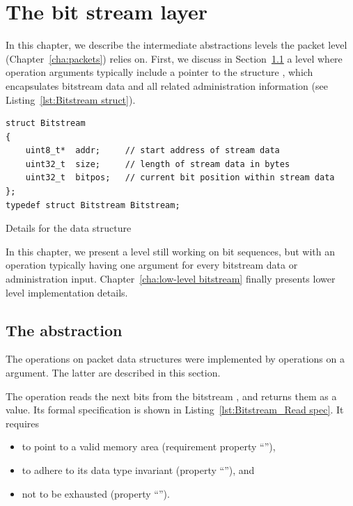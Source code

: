 
\FloatBarrier

\chapter{The bit stream layer}
\label{cha:bitstream}

In this chapter, we describe the intermediate abstractions levels the
packet level (Chapter~\ref{cha:packets}) relies on.
%
First, we discuss in Section~\ref{sec:bitstream}
a level where operation arguments typically include a pointer to the
\isoc structure , which
encapsulates bitstream data and all related administration information 
(see Listing~\ref{lst:Bitstream struct}).


\begin{listing}[hbt]
\begin{minipage}{0.99\textwidth}
\begin{lstlisting}[style=acsl-block]
struct Bitstream
{
    uint8_t*  addr;     // start address of stream data
    uint32_t  size;     // length of stream data in bytes
    uint32_t  bitpos;   // current bit position within stream data
};
typedef struct Bitstream Bitstream;
\end{lstlisting}
\end{minipage}
\caption{\label{lst:Bitstream struct}
	Details for the  data structure}
\end{listing}

\FloatBarrier

In this chapter, we present a level still working on
bit sequences, but with an operation typically
having one argument for every bitstream data or administration input.
%
Chapter~\ref{cha:low-level bitstream} finally presents lower level 
implementation details.







\clearpage

\section{The  abstraction}
\label{sec:bitstream}

The operations on packet data structures were implemented by 
operations on a  argument.
%
The latter are described in this section.

The operation 
reads the next  bits from the bitstream
, and returns them as a  value.
%
Its formal \acsl specification is shown in 
Listing~\ref{lst:Bitstream_Read spec}.
%
It requires 
%
\begin{itemize}
\item to point to a valid memory area 
	(requirement property ``''),
\item to adhere to its data type invariant
	(property ``''), and
\item not to be exhausted (property ``'').
\end{itemize}

